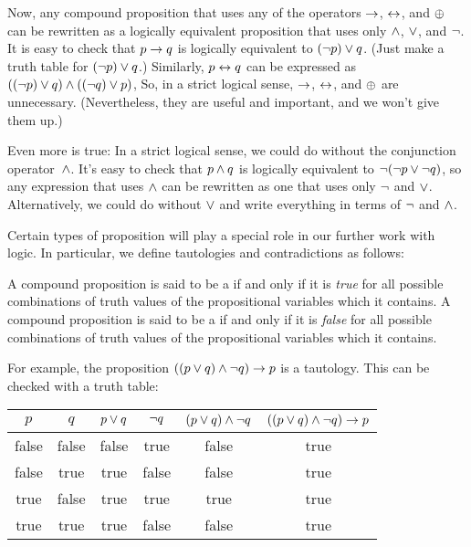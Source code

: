 \medbreak

Now, any compound proposition that uses any of the operators
$\rightarrow$, $\leftrightarrow$, and $\oplus$ can be rewritten as a logically
equivalent proposition that uses only $\wedge$, $\vee$, and $\lnot$.
It is easy to check that $p\rightarrow q$ is logically equivalent
to $(\lnot p)\vee q$.  (Just make a truth table for $(\lnot p)\vee q$.)
Similarly, $p\leftrightarrow q$ can be expressed as $((\lnot p) \vee q)\wedge ((\lnot q)\vee p)$,
So, in a strict logical sense, $\rightarrow$, $\leftrightarrow$, and $\oplus$ are
unnecessary.  (Nevertheless, they are useful and important, and
we won't give them up.)

Even more is true:  In a strict logical sense, we could do without
the conjunction operator~$\wedge$.  It's easy to check that
$p\wedge q$ is logically equivalent to $\lnot(\lnot p\vee\lnot q)$,
so any expression that uses $\wedge$ can be rewritten as one that
uses only $\lnot$ and $\vee$.  Alternatively, we could do without
$\vee$ and write everything in terms of $\lnot$ and $\wedge$.

\medbreak

Certain types of proposition will play a special role in our
further work with logic.  In particular, we define tautologies
and contradictions as follows:

\begin{definition}
A compound proposition is said to be a  if and only if
it is \emph{true} for all possible combinations of truth values of
the propositional variables which it contains.  
A compound proposition is said to be a  if and only if
it is \emph{false} for all possible combinations of truth values of
the propositional variables which it contains.  
\end{definition}


For example, the proposition $((p\vee q)\wedge \lnot q)\rightarrow p$ is a tautology.
This can be checked with a truth table:

\begin{center}
   \begin{tabular}{|c|c||c|c|c|c|}
      \hline
      $p$&   $q$&   $p\vee q$&  $\lnot q$&  $(p\vee q)\wedge \lnot q$& $((p\vee q)\wedge \lnot q)\rightarrow p$\\
      \hline
      \strut false& false& false&     true&      false&                 true\\
      false& true&  true&      false&     false&                 true\\
      true&  false& true&      true&      true&                  true\\
      true&  true&  true&      false&     false&                 true\\
      \hline
   \end{tabular}
\end{center}


